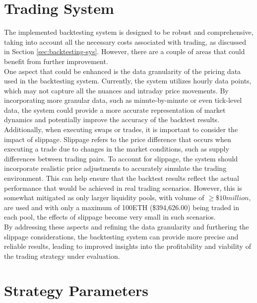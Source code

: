 \section{Trading System}
The implemented backtesting system is designed to be robust and comprehensive, taking into account all the necessary costs associated with trading, as discussed in Section \ref{sec:backtesting-sys}. However, there are a couple of areas that could benefit from further improvement.
\\[3mm]
One aspect that could be enhanced is the data granularity of the pricing data used in the backtesting system. Currently, the system utilizes hourly data points, which may not capture all the nuances and intraday price movements. By incorporating more granular data, such as minute-by-minute or even tick-level data, the system could provide a more accurate representation of market dynamics and potentially improve the accuracy of the backtest results.
\\[3mm]
Additionally, when executing swaps or trades, it is important to consider the impact of slippage. Slippage refers to the price difference that occurs when executing a trade due to changes in the market conditions, such as supply differences between trading pairs. To account for slippage, the system should incorporate realistic price adjustments to accurately simulate the trading environment. This can help ensure that the backtest results reflect the actual performance that would be achieved in real trading scenarios. However, this is somewhat mitigated as only larger liquidity pools, with volume of $\geq \$10 million$, are used and with only a maximum of 100ETH (\$394,626.00) being traded in each pool, the effects of slippage become very small in such scenarios.
\\[3mm]
By addressing these aspects and refining the data granularity and furthering the slippage considerations, the backtesting system can provide more precise and reliable results, leading to improved insights into the profitability and viability of the trading strategy under evaluation.

\section{Strategy Parameters}


